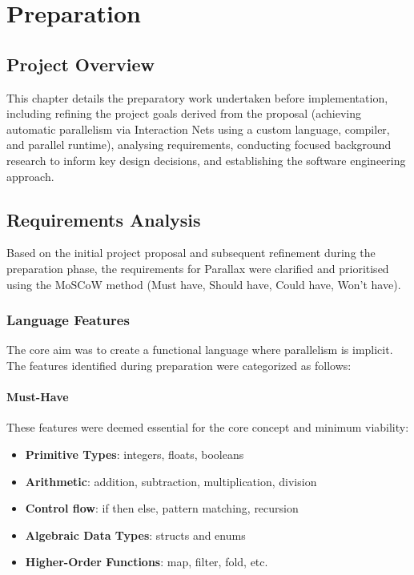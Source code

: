 \chapter{Preparation}

\section{Project Overview}
This chapter details the preparatory work undertaken before implementation, including refining the project goals derived from the proposal (achieving automatic parallelism via Interaction Nets using a custom language, compiler, and parallel runtime), analysing requirements, conducting focused background research to inform key design decisions, and establishing the software engineering approach.

\section{Requirements Analysis}
Based on the initial project proposal and subsequent refinement during the preparation phase, the requirements for Parallax were clarified and prioritised using the MoSCoW method (Must have, Should have, Could have, Won't have).

\subsection{Language Features}

The core aim was to create a functional language where parallelism is implicit. The features identified during preparation were categorized as follows:

\subsubsection*{Must-Have}
These features were deemed essential for the core concept and minimum viability:
\begin{itemize}
    \item \textbf{Primitive Types}: integers, floats, booleans
    \item \textbf{Arithmetic}: addition, subtraction, multiplication, division
    \item \textbf{Control flow}: if then else, pattern matching, recursion
    \item \textbf{Algebraic Data Types}: structs and enums
    \item \textbf{Higher-Order Functions}: map, filter, fold, etc.
\end{itemize}

